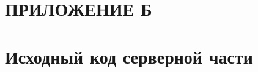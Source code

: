 \section*{ПРИЛОЖЕНИЕ Б}
\section*{Исходный код серверной части}
\label{chp:application-b}










\pagebreak 

